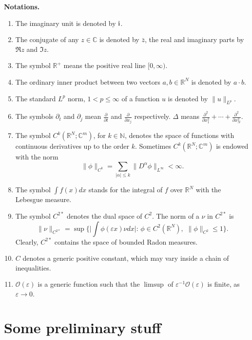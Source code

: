 \documentclass[11pt]{amsart}
\numberwithin{equation}{section}
\theoremstyle{definition}
\begin{document}
\vskip20pt
\begin{center}\textbf{Notations.}\end{center}
\begin{enumerate}
\item The imaginary unit is denoted by ${{\rm i}}$.
\item The conjugate of any $z\in{{\mathbb C}}$ is denoted by $\bar z$, the real and imaginary parts by $\Re z$ and $\Im z$.
\item The symbol ${{\mathbb R}}^+$ means the positive real line $[0,\infty)$.
\item The ordinary inner product between two vectors $a,b\in{{\mathbb R}}^N$ is denoted by $a \cdot b$.
\item The standard $L^p$ norm, $1<p\leq\infty$ of a function $u$ is denoted by $\|u\|_{L^p}$.
\item The symbols $\partial_t$ and $\partial_j$ mean $\frac{\partial}{\partial t}$ and $\frac{\partial}{\partial x_j}$ respectively. $\Delta$ means $\frac{\partial^2}{\partial x_{1}^2}+\cdots+\frac{\partial^2}{\partial x_{N}^2}$.
\item The symbol $C^k({{\mathbb R}}^N;{{\mathbb C}}^m)$, for $k\in{{\mathbb N}}$, denotes the space of functions with continuous derivatives up to
the order $k$. Sometimes $C^k({{\mathbb R}}^N;{{\mathbb C}}^m)$ is endowed with the norm
$$
\|\phi\|_{C^k}=\sum_{|\alpha|\leq k}\|D^\alpha\phi\|_{L^\infty}<\infty.
$$
\item The symbol $\int f(x)dx$ stands for the integral of $f$ over ${{\mathbb R}}^N$ with the Lebesgue measure.
\item The symbol $C^{2*}$ denotes the dual space of $C^2$. The norm of a $\nu$ in $C^{2*}$ is
$$
\|\nu\|_{C^{2*}}=\sup\Big\{\big|\int \phi({\varepsilon} x)\nu dx\big|:\,\phi\in C^2({{\mathbb R}}^N),\,\,\|\phi\|_{C^2}\leq 1\Big\}.
$$
Clearly, $C^{2*}$ contains the space of bounded Radon measures.
\item $C$ denotes a generic positive constant, which may vary inside a chain of inequalities.
\item ${\mathcal O}({\varepsilon})$ is a generic function such that
the $\limsup$ of ${\varepsilon}^{-1}{\mathcal O}({\varepsilon})$ is finite, as ${\varepsilon}\to 0$.
\end{enumerate}

\medskip
\medskip

\section{Some preliminary stuff}
\label{preliminarysection}
\noindent
\end{document}
